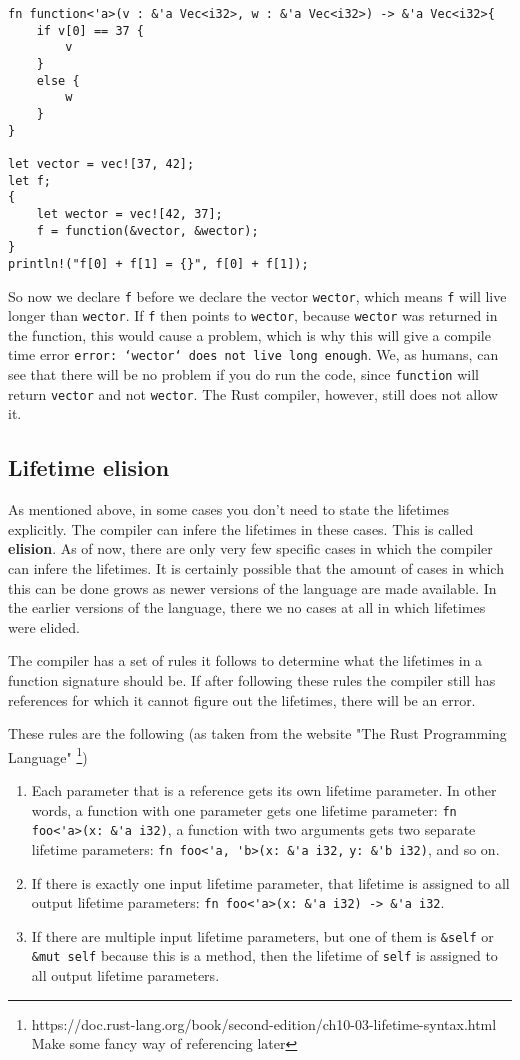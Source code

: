 \begin{verbatim}
fn function<'a>(v : &'a Vec<i32>, w : &'a Vec<i32>) -> &'a Vec<i32>{
    if v[0] == 37 {
        v
    }
    else {
        w
    }
}

let vector = vec![37, 42];
let f;
{
    let wector = vec![42, 37];
    f = function(&vector, &wector);
}
println!("f[0] + f[1] = {}", f[0] + f[1]);
\end{verbatim}

So now we declare \verb|f| before we declare the vector \verb|wector|, which means \verb|f| will live longer than \verb|wector|. If \verb|f| then points to \verb|wector|, because \verb|wector| was returned in the function, this would cause a problem, which is why this will give a compile time error \texttt{error: `wector` does not live long enough}. We, as humans, can see that there will be no problem if you do run the code, since \verb|function| will return \verb|vector| and not \verb|wector|. The Rust compiler, however, still does not allow it. 

\subsection{Lifetime elision}
As mentioned above, in some cases you don't need to state the lifetimes explicitly. The compiler can infere the lifetimes in these cases. This is called \textbf{elision}. As of now, there are only very few specific cases in which the compiler can infere the lifetimes. It is certainly possible that the amount of cases in which this can be done grows as newer versions of the language are made available. In the earlier versions of the language, there we no cases at all in which lifetimes were elided. 

The compiler has a set of rules it follows to determine what the lifetimes in a function signature should be. If after following these rules the compiler still has references for which it cannot figure out the lifetimes, there will be an error. 

These rules are the following (as taken from the website "The Rust Programming Language" \footnote{https://doc.rust-lang.org/book/second-edition/ch10-03-lifetime-syntax.html Make some fancy way of referencing later})

\begin{enumerate}[noitemsep]
    \item Each parameter that is a reference gets its own lifetime parameter. In other words, a function with one parameter gets one lifetime parameter: \verb|fn foo<'a>(x: &'a i32)|, a function with two arguments gets two separate lifetime parameters: \verb|fn foo<'a, 'b>(x: &'a i32,| \verb|y: &'b i32)|, and so on.
\item If there is exactly one input lifetime parameter, that lifetime is assigned to all output lifetime parameters: \verb|fn foo<'a>(x: &'a i32) -> &'a i32|.
\item If there are multiple input lifetime parameters, but one of them is \verb|&self| or \verb|&mut self| because this is a method, then the lifetime of \verb|self| is assigned to all output lifetime parameters.
\end{enumerate}

